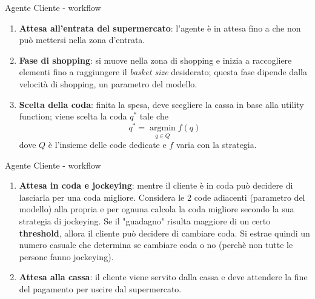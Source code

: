 \begin{frame}{Agente Cliente - workflow}
	\begin{enumerate}
		\item \textbf{Attesa all'entrata del supermercato}: l'agente è in attesa fino a che non può mettersi nella zona d'entrata.
		\item \textbf{Fase di shopping}: si muove nella zona di shopping e inizia a raccogliere elementi fino a raggiungere il \textit{basket size} desiderato; questa fase dipende dalla velocità di shopping, un parametro del modello.
		\item \textbf{Scelta della coda}: finita la spesa, deve scegliere la cassa in base alla utility function; viene scelta la coda $q^*$ tale che
		\[q^* = \operatorname*{argmin}_{q \in Q} f(q)\]
		dove $Q$ è l'insieme delle code dedicate e $f$ varia con la strategia.
	\end{enumerate}
\end{frame}
\begin{frame}{Agente Cliente - workflow}
	\begin{enumerate}
		\item \textbf{Attesa in coda e jockeying}: mentre il cliente è in coda può decidere di lasciarla per una coda migliore. Considera le 2 code adiacenti (parametro del modello) alla propria e per ognuna calcola la coda migliore secondo la sua strategia di jockeying. Se il "guadagno" risulta maggiore di un certo \textbf{threshold}, allora il cliente può decidere di cambiare coda. Si estrae quindi un numero casuale che determina se cambiare coda o no (perchè non tutte le persone fanno jockeying).
		\item \textbf{Attesa alla cassa}: il cliente viene servito dalla cassa e deve attendere la fine del pagamento per uscire dal supermercato.
	\end{enumerate}
\end{frame}




